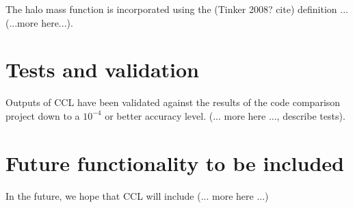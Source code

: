 \documentclass[\docopts]{\docclass}
\begin{document}
The halo mass function is incorporated using the (Tinker 2008? cite) definition ... (...more here...).

\section{Tests and validation}
\label{sec:tests}

Outputs of CCL have been validated against the results of the code comparison project down to a $10^{-4}$ or better accuracy level. (... more here ..., describe tests).

\section{Future functionality to be included}

In the future, we hope that CCL will include (... more here ...)





\end{document}
